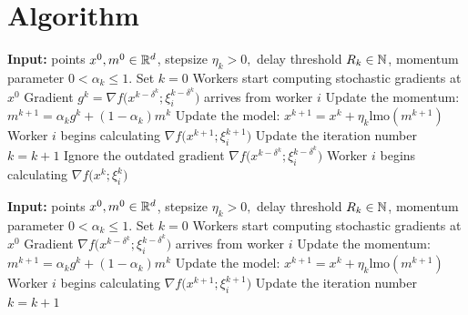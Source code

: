 \documentclass{article}
\begin{document}
\section{Algorithm}
% 
% 
% 
\begin{algorithm}[H]
  \caption{LMO \ringmaster (without calculation stops)}
  \label{alg:ringmaster_lmo}
  \begin{algorithmic}[1]
      \STATE \textbf{Input:} points $x^0, m^0 \in \mathbb{R}^d$, stepsize $\eta_k > 0,$ delay threshold $R_k \in \mathbb{N}$, momentum parameter $0<\alpha_k \le 1$.
      \STATE Set $k = 0$
      \STATE Workers start computing stochastic gradients at $x^0$
          \STATE Gradient $g^k = \nabla f\big(x^{k-\delta^k}; \xi^{k-\delta^k}_{i}\big)$ arrives from worker $i$
          \highlightcolor
              \color{black}
              \STATE Update the momentum: $m^{k+1} = \alpha_k g^k + (1-\alpha_k)m^{k} $
              \STATE Update the model:
                  $x^{k+1} = x^{k} + \eta_k\textrm{lmo}(m^{k+1})$
              \STATE Worker $i$ begins calculating 
                  $\nabla f\big(x^{k+1}; \xi^{k+1}_{i}\big)$
              \STATE Update the iteration number $k = k + 1$
          \ELSE
              \STATE Ignore the outdated gradient 
                  $\nabla f\big(x^{k-\delta^k}; \xi^{k-\delta^k}_{i}\big)$
              \STATE Worker $i$ begins calculating 
                  $\nabla f\big(x^{k}; \xi^{k}_{i}\big)$
          \ENDIF
      \ENDWHILE
  \end{algorithmic}
\end{algorithm}
% 
% 
\begin{algorithm}[H]
  \caption{\ringmaster (with calculation stops)}
  \label{alg:ringmasternewstops}
  \begin{algorithmic}[1]
      \STATE \textbf{Input:} points $x^0, m^0 \in \mathbb{R}^d$, stepsize $\eta_k > 0,$ delay threshold $R_k \in \mathbb{N}$, momentum parameter $0<\alpha_k \le 1$.
      \STATE Set $k = 0$
      \STATE Workers start computing stochastic gradients at $x^0$
          \STATE Gradient $\nabla f\big(x^{k-\delta^k}; \xi^{k-\delta^k}_{i}\big)$ arrives from worker $i$
          \STATE Update the momentum: $m^{k+1} = \alpha_k g^k + (1-\alpha_k)m^{k} $
          \STATE Update the model:
              $x^{k+1} = x^{k} + \eta_k\textrm{lmo}(m^{k+1})$
          \STATE Worker $i$ begins calculating 
              $\nabla f\big(x^{k+1}; \xi^{k+1}_{i}\big)$
          \STATE Update the iteration number $k = k + 1$
      \ENDWHILE
  \end{algorithmic}
\end{algorithm}
% 
% 
\end{document}
